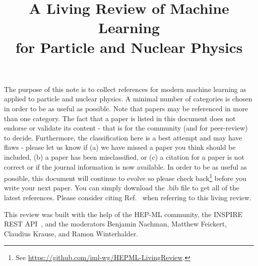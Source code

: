 \documentclass[12pt,letterpaper]{article}
\title{\boldmath A Living Review of Machine Learning \\  for Particle and Nuclear Physics}
\begin{document}
\maketitle

The purpose of this note is to collect references for modern machine learning as applied to particle and nuclear physics.  A minimal number of categories is chosen in order to be as useful as possible.  Note that papers may be referenced in more than one category.  The fact that a paper is listed in this document does not endorse or validate its content - that is for the community (and for peer-review) to decide.  Furthermore, the classification here is a best attempt and may have flaws - please let us know if (a) we have missed a paper you think should be included, (b) a paper has been misclassified, or (c) a citation for a paper is not correct or if the journal information is now available.  In order to be as useful as possible, this document will continue to evolve so please check back\footnote{See \href{https://github.com/iml-wg/HEPML-LivingReview}{https://github.com/iml-wg/HEPML-LivingReview}.} before you write your next paper.  You can simply download the .bib file to get all of the latest references.  Please consider citing Ref.~\cite{Feickert:2021ajf} when referring to this living review.


This review was built with the help of the HEP-ML community, the INSPIRE REST API~\cite{Moskovic:2021zjs}, and the moderators Benjamin Nachman, Matthew Feickert, Claudius Krause, and Ramon Winterhalder.
\end{document}
